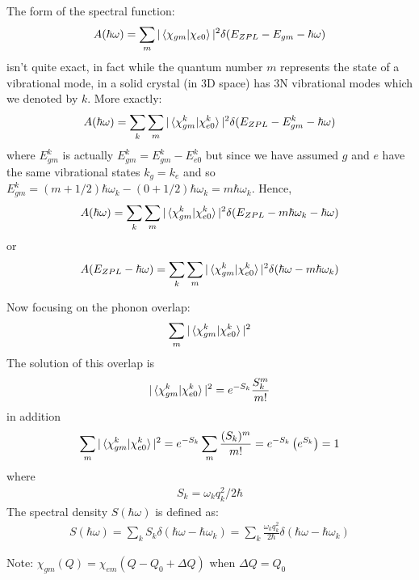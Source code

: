 The form of the spectral function:
\begin{align}
    A(\hbar\omega) = \sum_m |\braket{\chi_{gm}|\chi_{e0}}|^2 \delta(E_{ZPL}-E_{gm}-\hbar\omega)
\end{align}
isn't quite exact, in fact while the quantum number $m$ represents the state of a vibrational mode, in a solid crystal (in 3D space) has 3N vibrational modes which we denoted by $k$.  More exactly:
\begin{align}
    A(\hbar\omega) = \sum_k \sum_m |\braket{\chi_{gm}^k|\chi_{e0}^k}|^2 \delta(E_{ZPL}-E_{gm}^k-\hbar\omega)
\end{align}
where $E_{gm}^k$ is actually $E_{gm}^k = E_{gm}^k - E_{e0}^k$ but since we have assumed $g$ and $e$ have the same vibrational states $k_g = k_e$ and so $E_{gm}^k = (m+1/2)\hbar\omega_k - (0+1/2)\hbar\omega_k  = m\hbar\omega_k$. Hence,
\begin{align}
    A(\hbar\omega) = \sum_k \sum_m |\braket{\chi_{gm}^k|\chi_{e0}^k}|^2 \delta(E_{ZPL}-m\hbar\omega_k-\hbar\omega)
\end{align}
or
\begin{align}
    A(E_{ZPL}-\hbar\omega) = \sum_k \sum_m |\braket{\chi_{gm}^k|\chi_{e0}^k}|^2 \delta(\hbar\omega-m\hbar\omega_k)
\end{align}


Now focusing on the phonon overlap:
\begin{align}
    \sum_m |\braket{\chi_{gm}^k|\chi_{e0}^k}|^2
\end{align}
The solution of this overlap is~\cite{davies1981jahn}
\begin{align}
    |\braket{\chi_{gm}^k|\chi_{e0}^k}|^2 = e^{-S_k}\frac{S_k^{m}}{m!}
\end{align}
in addition
\begin{align}
    \sum_m |\braket{\chi_{gm}^k|\chi_{e0}^k}|^2 = e^{-S_k} \sum_m \frac{(S_k)^{m}}{m!} = e^{-S_k} \left(e^{S_k}\right) = 1
\end{align}
where
\begin{align}
    S_k = \omega_k q_k^2/2\hbar
\end{align}
The spectral density $S(\hbar\omega)$ is defined as:
\begin{align}
    S(\hbar\omega) = \sum_k S_k \delta(\hbar\omega - \hbar\omega_k) = \sum_k \frac{\omega_k q_k^2}{2\hbar} \delta(\hbar\omega - \hbar\omega_k)
\end{align}


\vspace{10mm}

Note: $\chi_{gm}(Q) = \chi_{em}(Q-Q_0 + \Delta Q)$ when $\Delta Q = Q_0$
